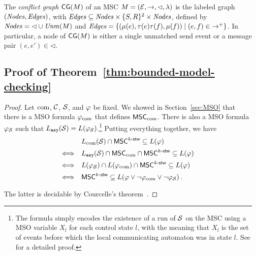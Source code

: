 \begin{definition}
	The \emph{conflict graph} $\mathsf{CG}(M)$ of an MSC $M = (\mathcal{E}, \rightarrow, \lhd, \lambda)$ is the labeled graph $(\mathit{Nodes}, \mathit{Edges})$, with $\mathit{Edges} \subseteq \mathit{Nodes} \times \{S,R\}^2 \times \mathit{Nodes}$, defined by
	$\mathit{Nodes} = {\lhd} \cup \mathit{Unm}(M)$ and $\mathit{Edges} = \{(\mu(e),\tau(e)\tau(f),\mu(f)) \mid (e,f) \in {\to^+}\}$.
In particular, a node of $\mathsf{CG}(M)$ is either a single unmatched send event or a message pair $(e,e') \in {\lhd}$.
\end{definition}


\subsection{Proof of Theorem~\ref{thm:bounded-model-checking}}


\thmBoundedMC*

\begin{proof}
   Let $\textup{com}$, $\mathcal{C}$, $\mathcal{S}$, and $\varphi$ 
   be fixed. We showed in Section~\ref{sec:MSO} 
   that there is a MSO formula
   $\varphi_{\textup{com}}$
   that defines $\mathsf{MSC}_{\textup{com}}$.
   There is also a MSO formula
   $\varphi_{\mathcal{S}}$ such that
   $L_{\mathtt{asy}}(\mathcal{S})=L(\varphi_{\mathcal{S}})$.\footnote{The formula
   simply encodes the existence of a run of $\mathcal{S}$ on the MSC
   using a MSO variable $X_l$ for each control
   state $l$, with the meaning that $X_l$ is the set of events
   before which the local communicating automaton was in state $l$. See \cite[Theorem~3.4]{DBLP:journals/corr/abs-1904-06942} for a detailed proof.}
   Putting everything together, we have
    \[\begin{array}{rl}
    &L_{\textup{com}}(\mathcal{S}) \cap \mathsf{MSC}^{k\textup{-}\mathsf{stw}} \subseteq L(\varphi)\\[1ex]
    \Longleftrightarrow &L_{\mathtt{asy}}(\mathcal{S}) \cap \mathsf{MSC}_{\textup{com}} \cap \mathsf{MSC}^{k\textup{-}\mathsf{stw}} \subseteq L(\varphi)\\[1ex]
    \Longleftrightarrow & L(\varphi_{\mathcal{S}}) \cap L(\varphi_{\textup{com}}) \cap \mathsf{MSC}^{k\textup{-}\mathsf{stw}} \subseteq L(\varphi)\\[1ex]
    \Longleftrightarrow &\mathsf{MSC}^{k\textup{-}\mathsf{stw}} \subseteq L(\varphi \vee \neg \varphi_{\textup{com}}\vee\neg\varphi_{\mathcal{S}})\,.
    \end{array}\]

    The latter is decidable by Courcelle's theorem~\cite{Courcelle10}.
\end{proof}


